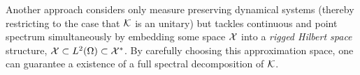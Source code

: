 Another approach \cite{rigged} considers only measure preserving dynamical systems 
(thereby restricting to the case that $\mathcal{K}$ is an unitary) but tackles continuous and 
point spectrum simultaneously by embedding some space $\mathcal{X}$ into a \emph{rigged Hilbert 
space} structure, $\mathcal{X} \subset L^2 (\Omega) \subset \mathcal{X}^*$. By carefully choosing this 
approximation space, one can guarantee a existence of a full spectral decomposition of 
$\mathcal{K}$. 


